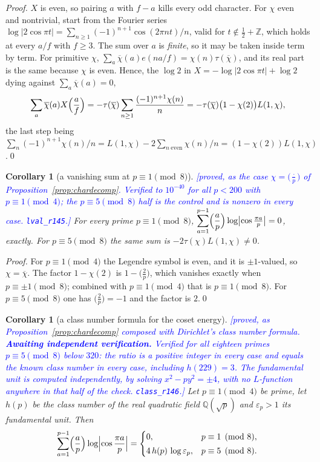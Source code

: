 \documentclass[11pt,a4paper]{article}
\theoremstyle{plain}
\newtheorem{corollary}[theorem]{Corollary}
\theoremstyle{definition}
\theoremstyle{remark}
\newcommand{\STATUS}[1]{\textcolor{blue}{\textsf{[#1]}}}
\begin{document}
\begin{proof}
$X$ is even, so pairing $a$ with $f-a$ kills every odd character. For $\chi$ even and
nontrivial, start from the Fourier series
$\log|2\cos\pi t|=\sum_{n\ge1}(-1)^{n+1}\cos(2\pi nt)/n$, valid for $t\notin\tfrac12+\mathbb{Z}$,
which holds at every $a/f$ with $f\ge3$. The sum over $a$ is \emph{finite}, so it may be taken
inside term by term. For primitive $\chi$,
$\sum_{a}\overline{\chi}(a)e(na/f)=\chi(n)\tau(\overline{\chi})$, and its real part is the same
because $\chi$ is even. Hence, the $\log2$ in $X=-\log|2\cos\pi t|+\log2$ dying against
$\sum_a\overline{\chi}(a)=0$,
\[
  \sum_{a}\overline{\chi}(a)X\Bigl(\frac af\Bigr)
  =-\tau(\overline{\chi})\sum_{n\ge1}\frac{(-1)^{n+1}\chi(n)}{n}
  =-\tau(\overline{\chi})\bigl(1-\chi(2)\bigr)L(1,\chi),
\]
the last step being $\sum_n(-1)^{n+1}\chi(n)/n=L(1,\chi)-2\sum_{n\ \mathrm{even}}\chi(n)/n
=(1-\chi(2))L(1,\chi)$.\qed
\end{proof}

\begin{corollary}[a vanishing sum at $p\equiv1\pmod 8$]\label{cor:vanish}
\STATUS{proved, as the case $\chi=\bigl(\tfrac{\cdot}{p}\bigr)$ of
Proposition~\ref{prop:chardecomp}. Verified to $10^{-40}$ for all $p<200$ with $p\equiv1\pmod4$;
the $p\equiv5\pmod8$ half is the control and is nonzero in every case.
\texttt{lval\_r145}.}
For every prime $p\equiv1\pmod 8$,
$\displaystyle\sum_{a=1}^{p-1}\Bigl(\frac ap\Bigr)\log\bigl|\cos\tfrac{\pi a}{p}\bigr|=0$,
exactly. For $p\equiv5\pmod8$ the same sum is $-2\tau(\chi)L(1,\chi)\ne0$.
\end{corollary}

\begin{proof}
For $p\equiv1\pmod4$ the Legendre symbol is even, and it is $\pm1$-valued, so
$\chi=\overline\chi$. The factor $1-\chi(2)$ is $1-\bigl(\tfrac2p\bigr)$, which vanishes exactly
when $p\equiv\pm1\pmod8$; combined with $p\equiv1\pmod4$ that is $p\equiv1\pmod8$. For
$p\equiv5\pmod8$ one has $\bigl(\tfrac2p\bigr)=-1$ and the factor is $2$.\qed
\end{proof}

\begin{corollary}[a class number formula for the coset energy]\label{cor:classnumber}
\STATUS{proved, as Proposition~\ref{prop:chardecomp} composed with Dirichlet's class number
formula. \textbf{Awaiting independent verification.} Verified for all eighteen primes
$p\equiv5\pmod8$ below $320$: the ratio is a positive integer in every case and equals the known
class number in every case, including $h(229)=3$. The fundamental unit is computed independently,
by solving $x^{2}-py^{2}=\pm4$, with no $L$-function anywhere in that half of the check.
\texttt{class\_r146}.}
Let $p\equiv1\pmod4$ be prime, let $h(p)$ be the class number of the real quadratic field
$\mathbb{Q}(\sqrt p)$ and $\varepsilon_p>1$ its fundamental unit. Then
\[
  \sum_{a=1}^{p-1}\Bigl(\frac ap\Bigr)\log\Bigl|\cos\frac{\pi a}{p}\Bigr|
  =\begin{cases}
     0, & p\equiv1\pmod8,\\[2pt]
     4\,h(p)\,\log\varepsilon_p, & p\equiv5\pmod8.
   \end{cases}
\]
\end{corollary}
\end{document}
